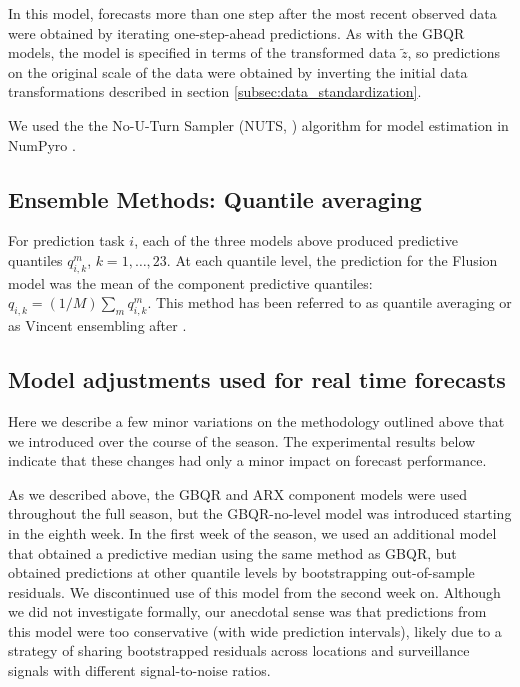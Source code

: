 \documentclass{article}\usepackage[]{graphicx}\usepackage[]{xcolor}
\begin{document}
In this model, forecasts more than one step after the most recent observed data were obtained by iterating one-step-ahead predictions. As with the GBQR models, the model is specified in terms of the transformed data $\tilde{z}$, so predictions on the original scale of the data were obtained by inverting the initial data transformations described in section \ref{subsec:data_standardization}.

We used the the No-U-Turn Sampler (NUTS, \cite{hoffman2014nuts}) algorithm for model estimation in NumPyro \cite{phan2019composable}.

\subsection{Ensemble Methods: Quantile averaging}
\label{subsec:model_ensemble}

For prediction task $i$, each of the three models above produced predictive quantiles $q^m_{i,k}$, $k = 1, \ldots, 23$.  At each quantile level, the prediction for the Flusion model was the mean of the component predictive quantiles: $q_{i,k} = (1/M) \sum_m q^m_{i,k}$. This method has been referred to as quantile averaging \cite[e.g., ][]{lichtendahl2013betterAveProbQuant} or as Vincent ensembling after \cite{vincent1912functionsOfVibrissae}.

\subsection{Model adjustments used for real time forecasts}
\label{subsec:model_realtime}

Here we describe a few minor variations on the methodology outlined above that we introduced over the course of the season. The experimental results below indicate that these changes had only a minor impact on forecast performance.

As we described above, the GBQR and ARX component models were used throughout the full season, but the GBQR-no-level model was introduced starting in the eighth week. In the first week of the season, we used an additional model that obtained a predictive median using the same method as GBQR, but obtained predictions at other quantile levels by bootstrapping out-of-sample residuals. We discontinued use of this model from the second week on. Although we did not investigate formally, our anecdotal sense was that predictions from this model were too conservative (with wide prediction intervals), likely due to a strategy of sharing bootstrapped residuals across locations and surveillance signals with different signal-to-noise ratios.
\end{document}
